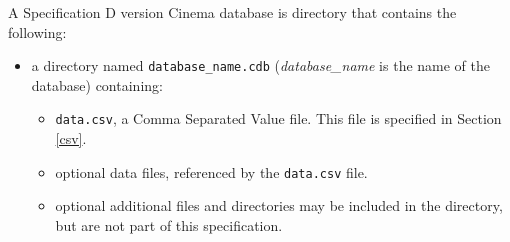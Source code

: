 A Specification D version \version Cinema database is directory that contains the following: 

\begin{itemize}
\item a directory named \texttt{\small database\_name.cdb} 
  ({\em database\_name} is the name of the database) containing:
\begin{itemize}
\item \texttt{\small data.csv}, a Comma Separated Value file. This file is
  specified in Section \ref{csv}.
\item optional data files, referenced by the \texttt{\small data.csv} file.
\item optional additional files and directories may be included in the directory, but are not part of this specification. 
\end{itemize}
\end{itemize}
